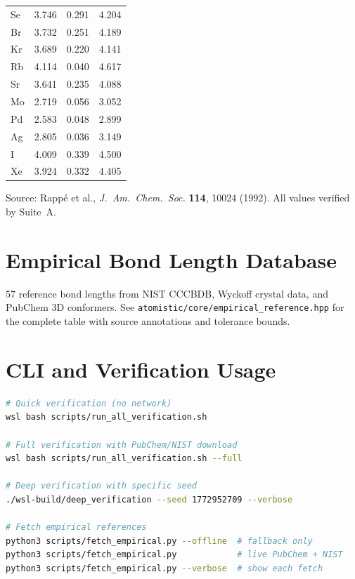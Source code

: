 \documentclass[11pt,twoside]{article}
\begin{document}
\begin{longtable}{lrrr}
Se & 3.746 & 0.291 & 4.204 \\
Br & 3.732 & 0.251 & 4.189 \\
Kr & 3.689 & 0.220 & 4.141 \\
Rb & 4.114 & 0.040 & 4.617 \\
Sr & 3.641 & 0.235 & 4.088 \\
Mo & 2.719 & 0.056 & 3.052 \\
Pd & 2.583 & 0.048 & 2.899 \\
Ag & 2.805 & 0.036 & 3.149 \\
I  & 4.009 & 0.339 & 4.500 \\
Xe & 3.924 & 0.332 & 4.405 \\
\bottomrule
\end{longtable}

\noindent Source: Rapp\'{e} et al., \textit{J.\ Am.\ Chem.\ Soc.}
\textbf{114}, 10024 (1992).  All values verified by Suite~A.


\section{Empirical Bond Length Database}
\label{app:bonds}

57 reference bond lengths from NIST CCCBDB, Wyckoff crystal data, and
PubChem 3D conformers.  See \texttt{atomistic/core/empirical\_reference.hpp}
for the complete table with source annotations and tolerance bounds.


\section{CLI and Verification Usage}
\label{app:cli}

\begin{lstlisting}[language=bash,frame=none]
# Quick verification (no network)
wsl bash scripts/run_all_verification.sh

# Full verification with PubChem/NIST download
wsl bash scripts/run_all_verification.sh --full

# Deep verification with specific seed
./wsl-build/deep_verification --seed 1772952709 --verbose

# Fetch empirical references
python3 scripts/fetch_empirical.py --offline  # fallback only
python3 scripts/fetch_empirical.py            # live PubChem + NIST
python3 scripts/fetch_empirical.py --verbose  # show each fetch
\end{lstlisting}


\end{document}
